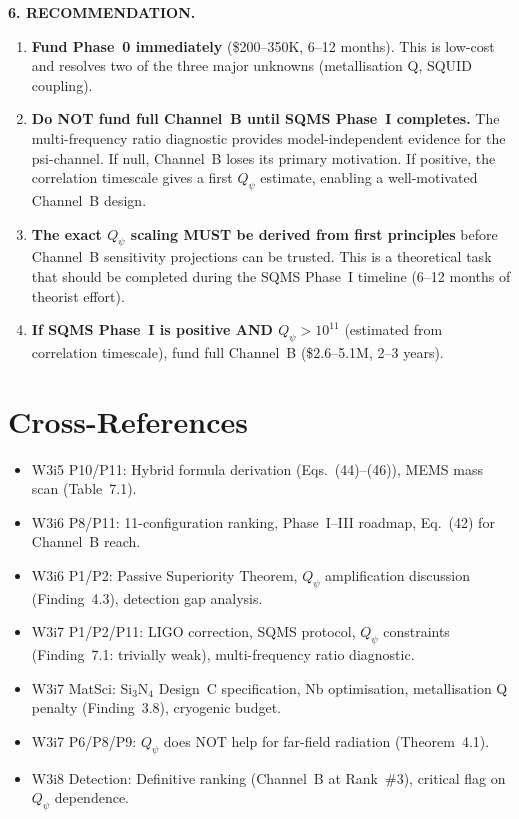 \documentclass[11pt]{article}
\newcommand{\Qpsi}{Q_\psi}
\theoremstyle{definition}
\theoremstyle{remark}
\begin{document}
\begin{tcolorbox}[colback=blue!5!white, colframe=blue!60!black,
  title=\textbf{W3i9 CHANNEL~B AUDIT: FINAL VERDICT}, breakable]
\textbf{6. RECOMMENDATION.}
\begin{enumerate}[nosep]
\item \textbf{Fund Phase~0 immediately} (\$200--350K, 6--12 months).
  This is low-cost and resolves two of the three major unknowns
  (metallisation Q, SQUID coupling).
\item \textbf{Do NOT fund full Channel~B until SQMS Phase~I completes.}
  The multi-frequency ratio diagnostic provides model-independent
  evidence for the psi-channel. If null, Channel~B loses its
  primary motivation. If positive, the correlation timescale gives
  a first $\Qpsi$ estimate, enabling a well-motivated Channel~B
  design.
\item \textbf{The exact $\Qpsi$ scaling MUST be derived from first
  principles} before Channel~B sensitivity projections can be
  trusted. This is a theoretical task that should be completed
  during the SQMS Phase~I timeline (6--12 months of theorist effort).
\item \textbf{If SQMS Phase~I is positive AND $\Qpsi > 10^{11}$}
  (estimated from correlation timescale), fund full Channel~B
  (\$2.6--5.1M, 2--3 years).
\end{enumerate}
\end{tcolorbox}


\section{Cross-References}
\label{sec:crossrefs}

\begin{itemize}[nosep]
\item W3i5 P10/P11: Hybrid formula derivation (Eqs.~(44)--(46)),
  MEMS mass scan (Table~7.1).
\item W3i6 P8/P11: 11-configuration ranking, Phase~I--III roadmap,
  Eq.~(42) for Channel~B reach.
\item W3i6 P1/P2: Passive Superiority Theorem, $\Qpsi$ amplification
  discussion (Finding~4.3), detection gap analysis.
\item W3i7 P1/P2/P11: LIGO correction, SQMS protocol, $\Qpsi$
  constraints (Finding~7.1: trivially weak), multi-frequency ratio
  diagnostic.
\item W3i7 MatSci: Si$_3$N$_4$ Design~C specification, Nb optimisation,
  metallisation Q penalty (Finding~3.8), cryogenic budget.
\item W3i7 P6/P8/P9: $\Qpsi$ does NOT help for far-field radiation
  (Theorem~4.1).
\item W3i8 Detection: Definitive ranking (Channel~B at Rank~\#3),
  critical flag on $\Qpsi$ dependence.
\end{itemize}
\end{document}
